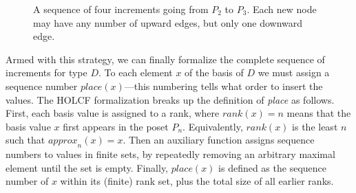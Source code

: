 \documentclass{llncs}
\begin{document}
\begin{figure}
\begin{center}
\end{center}
\caption{\label{fig:increments}A sequence of four increments going
  from $P_2$ to $P_3$.  Each new node may have any number of upward
  edges, but only one downward edge.}
\end{figure}

Armed with this strategy, we can finally formalize the complete
sequence of increments for type $D$.  To each element $x$ of the basis
of $D$ we must assign a sequence number $\mathit{place}(x)$---this
numbering tells what order to insert the values.  The HOLCF
formalization breaks up the definition of \emph{place} as follows.
First, each basis value is assigned to a rank, where $\mathit{rank}(x)
= n$ means that the basis value $x$ first appears in the poset $P_n$.
Equivalently, $\mathit{rank}(x)$ is the least $n$ such that
$\mathit{approx}_n(x) = x$.  Then an auxiliary function assigns
sequence numbers to values in finite sets, by repeatedly removing an
arbitrary maximal element until the set is empty.  Finally,
$\mathit{place}(x)$ is defined as the sequence number of $x$ within
its (finite) rank set, plus the total size of all earlier ranks.
\end{document}
